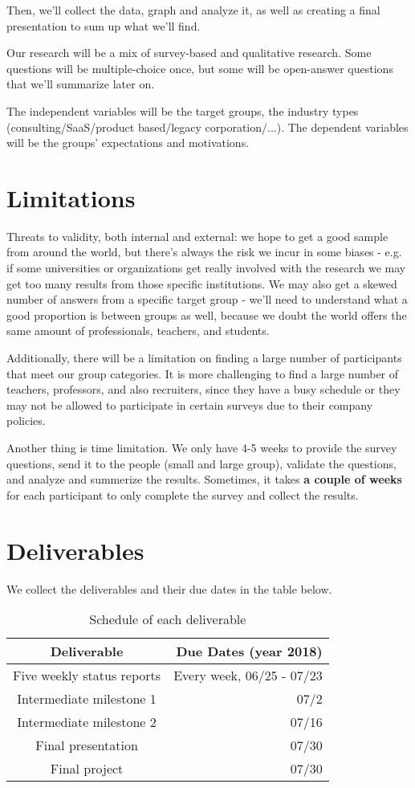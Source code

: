 \documentclass{sigchi}
\begin{document}
 Then, we'll collect the data, graph and analyze it, as well as creating a final presentation to sum up what we'll find.
 
 Our research will be a mix of survey-based and qualitative research. Some questions will be multiple-choice once, but some will be open-answer questions that we'll summarize later on.
 
 The independent variables will be the target groups, the industry types (consulting/SaaS/product based/legacy corporation/...). The dependent variables will be the groups' expectations and motivations.
 
  \section{Limitations}
 Threats to validity, both internal and external: we hope to get a good sample from around the world, but there's always the risk we incur in some biases - e.g. if some universities or organizations get really involved with the research we may get too many results from those specific institutions. We may also get a skewed number of answers from a specific target group - we'll need to understand what a good proportion is between groups as well, because we doubt the world offers the same amount of professionals, teachers, and students.
 
Additionally, there will be a limitation on finding a large number of participants that meet our group categories. It is more challenging to find a large number of teachers, professors, and also recruiters, since they have a busy schedule or they may not be allowed to participate in certain surveys due to their company policies. 
  
 Another thing is time limitation. We only have 4-5 weeks to provide the survey questions, send it to the people (small and large group), validate the questions, and analyze and summerize the results. Sometimes, it takes \textbf{a couple of weeks} for each participant to only complete the survey and collect the results.
 
  
 \section{Deliverables}
 We collect the deliverables and their due dates in the table below.
 
 \begin{table}[H]
 \centering
 \begin{tabular}{c r} 					%
 \hline\hline						%
 Deliverable & Due Dates (year 2018)\\
 \hline
 Five weekly status reports & Every week, 06/25 - 07/23\\
 Intermediate milestone 1 & 07/2\\
 Intermediate milestone 2 & 07/16\\
 Final presentation & 07/30\\
 Final project & 07/30\\
 \hline
 \end{tabular}
 \caption{Schedule of each deliverable} 	%
 \end{table}
	  
\end{document}
